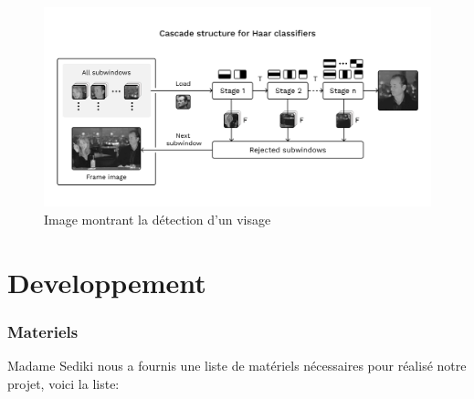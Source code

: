 \documentclass{article}
\begin{document}
\begin{figure}[h]
    \centering
    \includegraphics[width=\textwidth]{image/Cascade_structure_for_Haar_classifiers.png}
    \caption{Image montrant la détection d'un visage}
    \label{fig:mon_image}
\end{figure}
  
\part{Developpement}


\section{Materiels}
Madame Sediki nous a fournis une liste de matériels nécessaires pour réalisé notre projet, voici la liste:

    
\end{document}
